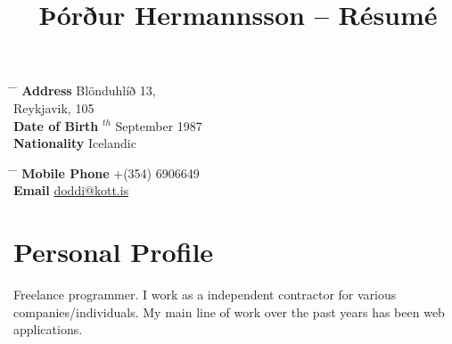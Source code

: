 \documentclass[10pt]{article} %
\begin{document}

\title{Þórður Hermannsson -- Résumé} %


\parbox{0.5\textwidth}{ %
\begin{tabbing} %
\hspace{3cm} \= \hspace{4cm} \= \kill %
{\bf Address} \> Blönduhlíð 13,\\ %
\> Reykjavik, 105\\ %
{\bf Date of Birth} $^{th}$ September 1987\\ %
{\bf Nationality} \> Icelandic %
\end{tabbing}}
\hfill %
\parbox{0.5\textwidth}{ %
\begin{tabbing} %
\hspace{3cm} \= \hspace{4cm} \= \kill %
{\bf Mobile Phone} \> +(354) 6906649 \\ %
{\bf Email} \> \href{mailto:doddi@kott.is}{doddi@kott.is} \\ %
\end{tabbing}}


\section{Personal Profile}

Freelance programmer. I work as a independent contractor for various companies/individuals. 
My main line of work over the past years has been web applications.

\end{document}
